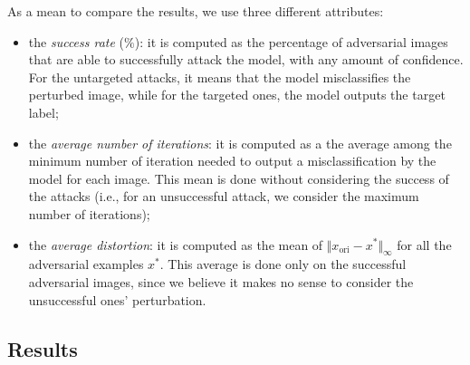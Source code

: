 \documentclass[10pt,twocolumn,letterpaper, english]{article}
\theoremstyle{definition}
\theoremstyle{plain}
\theoremstyle{plain}
\theoremstyle{plain}
\theoremstyle{plain}
\theoremstyle{remark}
\theoremstyle{remark}
\theoremstyle{definition}
\theoremstyle{definition}
\theoremstyle{definition}
\theoremstyle{definition}
\begin{document}
As a mean to compare the results, we use three different attributes: 
\begin{itemize}
    \item the \textit{success rate} ($\%$): it is computed as the percentage of adversarial images that are able to successfully attack the model, with any amount of confidence. For the untargeted attacks, it means that the model misclassifies the perturbed image, while for the targeted ones, the model outputs the target label;
    
    \item the \textit{average number of iterations}: it is computed as a the average among the minimum number of iteration needed to output a misclassification by the model for each image. This mean is done without considering the success of the attacks (i.e., for an unsuccessful attack, we consider the maximum number of iterations); 
    
    \item the \textit{average distortion}: it is computed as the mean of $\Vert x_{\text{ori}} - x^\ast \Vert_{\infty}$ for all the adversarial examples $x^*$. This average is done only on the successful adversarial images, since we believe it makes no sense to consider the unsuccessful ones' perturbation. 
\end{itemize}

\subsection{Results}


 

\end{document}
